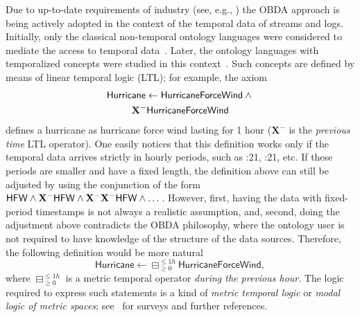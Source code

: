 \documentclass{article}
\begin{document}
Due to up-to-date requirements of industry (see, e.g., \cite{DBLP:conf/semweb/KharlamovSOZHLRSW14}) the OBDA approach is  being actively adopted in the context of the temporal data of streams and logs. Initially, only the classical non-temporal ontology languages were considered to mediate the access to temporal data~\cite{DBLP:conf/rr/Gutierrez-BasultoK12,OMNZK:13,BBL13,DBLP:conf/rr/KlarmanM14}. Later, the ontology languages with temporalized concepts were studied in this context~\cite{DBLP:conf/ijcai/ArtaleKKRWZ15,IJCAI1toappear,GJK-IJCAI16}. Such concepts are defined by means of linear temporal logic (LTL); for example, the axiom
%
\begin{multline*}
{\sf Hurricane} \leftarrow \mathsf{HurricaneForceWind} \land{} \\
 \mathbf{X}^-\mathsf{HurricaneForceWind}
\end{multline*}
%
defines a hurricane as hurricane force wind lasting for 1 hour ($\mathbf{X}^-$ is the \emph{previous time} LTL operator). One easily notices that this definition works only if the temporal data arrives strictly in hourly periods, such as {:21}, {:21}, etc. If these periods are smaller and have a fixed length, the definition above can still be adjusted by using the conjunction of the form ${\sf HFW} \land \mathbf{X}^-{\sf HFW} \land \mathbf{X}^- \mathbf{X}^- {\sf HFW} \land \dots$. However, first, having the data with fixed-period timestamps is not always a realistic assumption, and, second, doing the adjustment above contradicts the OBDA philosophy, where the ontology user is not required to have knowledge of the structure of the data sources. Therefore, the following definition would be more natural
%
$$\mathsf{Hurricane} \leftarrow  \boxminus^{\leqslant 1h}_{\geqslant 0} \mathsf{HurricaneForceWind},$$
%
where $\boxminus^{\leqslant 1h}_{\geqslant 0}$ is a metric temporal operator \emph{during the previous hour}. The logic required to express such statements is a kind of \emph{metric temporal logic} or \emph{modal logic of metric spaces}; see~\cite{Koymans1990,DBLP:conf/birthday/KuruczWZ05} for surveys and further references.
\end{document}

